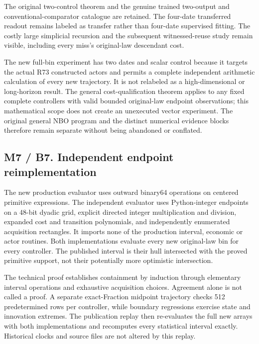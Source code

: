 The original two-control theorem and the genuine trained two-output and
conventional-comparator catalogue are retained. The four-date
transferred readout remains labeled as transfer rather than four-date
supervised fitting. The costly large simplicial recursion and the
subsequent witnessed-reuse study remain visible, including every miss's
original-law descendant cost.

The new full-bin experiment has two dates and scalar control because it
targets the actual R73 constructed actors and permits a complete
independent arithmetic calculation of every new trajectory. It is not
relabeled as a high-dimensional or long-horizon result. The general
cost-qualification theorem applies to any fixed complete controllers
with valid bounded original-law endpoint observations; this mathematical
scope does not create an unexecuted vector experiment. The original
general NBO program and the distinct numerical evidence blocks therefore
remain separate without being abandoned or conflated.

\hypertarget{m7-b7.-independent-endpoint-reimplementation}{%
\subsection{M7 / B7. Independent endpoint
reimplementation}\label{m7-b7.-independent-endpoint-reimplementation}}

The new production evaluator uses outward binary64 operations on
centered primitive expressions. The independent evaluator uses
Python-integer endpoints on a 48-bit dyadic grid, explicit directed
integer multiplication and division, expanded cost and transition
polynomials, and independently enumerated acquisition rectangles. It
imports none of the production interval, economic or actor routines.
Both implementations evaluate every new original-law bin for every
controller. The published interval is their hull intersected with the
proved primitive support, not their potentially more optimistic
intersection.

The technical proof establishes containment by induction through
elementary interval operations and exhaustive acquisition choices.
Agreement alone is not called a proof. A separate exact-Fraction
midpoint trajectory checks 512 predetermined rows per controller, while
boundary regressions exercise state and innovation extremes. The
publication replay then re-evaluates the full new arrays with both
implementations and recomputes every statistical interval exactly.
Historical clocks and source files are not altered by this replay.

